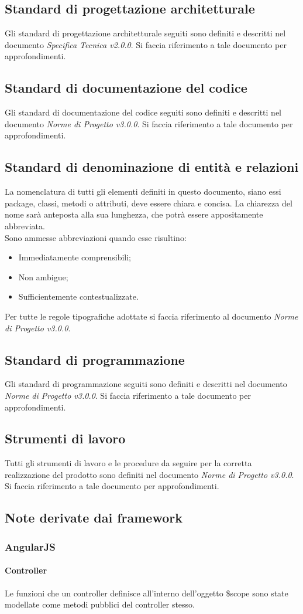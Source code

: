 \subsection{Standard di progettazione architetturale}
Gli standard di progettazione architetturale seguiti sono definiti e descritti nel documento \textit{Specifica Tecnica v2.0.0}. Si faccia riferimento a tale
documento per approfondimenti.

\subsection{Standard di documentazione del codice}
Gli standard di documentazione del codice seguiti sono definiti e descritti nel documento \textit{Norme di Progetto v3.0.0}. Si faccia riferimento a tale
documento per approfondimenti.

\subsection{Standard di denominazione di entità e relazioni}
La nomenclatura di tutti gli elementi definiti in questo documento, siano essi package, classi, metodi o attributi, deve essere chiara e concisa. 
La chiarezza del nome sarà anteposta alla sua lunghezza, che potrà essere appositamente abbreviata. \\
\noindent Sono ammesse abbreviazioni quando esse risultino:
\begin{itemize}
	 \item Immediatamente comprensibili;
	 \item Non ambigue;
	 \item Sufficientemente contestualizzate.
\end{itemize}
Per tutte le regole tipografiche adottate si faccia riferimento al documento \textit{Norme di Progetto v3.0.0}.

\subsection{Standard di programmazione}
Gli standard di programmazione seguiti sono definiti e descritti nel documento \textit{Norme di Progetto v3.0.0}. Si faccia riferimento a tale
documento per approfondimenti.

\subsection{Strumenti di lavoro}
Tutti gli strumenti di lavoro e le procedure da seguire per la corretta realizzazione del prodotto sono definiti nel documento \textit{Norme di Progetto v3.0.0}.
Si faccia riferimento a tale documento per approfondimenti.

\subsection{Note derivate dai framework}
	\subsubsection{AngularJS}
		\paragraph{Controller}
		Le funzioni che un controller definisce all'interno dell'oggetto \$scope sono state modellate come metodi pubblici del controller stesso.
